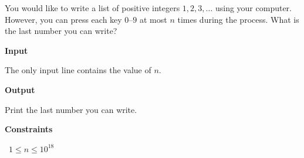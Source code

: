 You would like to write a list of positive integers $1,2,3,\ldots$ using your computer. However, you can press each key $0$–$9$ at most $n$ times during the process.
What is the last number you can write?

\vspace{0.3cm}\noindent\textbf{Input}

The only input line contains the value of $n$.

\vspace{0.3cm}\noindent\textbf{Output}

Print the last number you can write.

\vspace{0.3cm}\noindent\textbf{Constraints}

\textbullet\ $1 \le n \le 10^{18}$